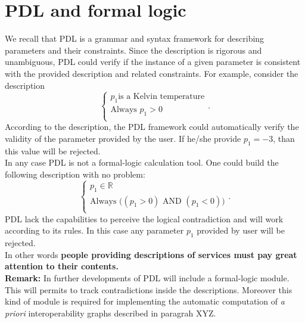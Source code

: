 \documentclass[a4paper,11pt] {article}
\begin{document}
\section{PDL and formal logic}
We recall that PDL is a grammar and syntax framework for describing parameters and their constraints. Since the description is rigorous and unambiguous, PDL could verify if the instance of a given parameter is consistent with the provided description and related constraints. For example, consider the description
\begin{equation}
\left\{
\begin{array}{l}
p_1 \mbox{is a Kelvin temperature}\\
\mbox{Always }  p_1 > 0 \\
\end{array}
\right..
\end{equation}
According to the description, the PDL framework could automatically verify the validity of the parameter provided by the user. 
If he/she provide $p_1=-3$, than this value will be rejected.\\
In any case PDL is not a formal-logic calculation tool. One could build the following description with no problem:
\begin{equation}
\left\{
\begin{array}{l}
p_1 \in \mathbb R\\
\displaystyle \mbox{Always } \big(  (p_1 > 0) \mbox{ AND } (p_1 < 0) \big)\\
\end{array}
\right..
\end{equation}
PDL lack the capabilities to perceive the logical contradiction and will work according to its rules. In   
this case any parameter $p_1$ provided by user will be rejected.\\
In other words {\bf people providing descriptions of services must pay great attention to their contents.}\\

{\bf Remark:} In further developments of PDL will include a formal-logic module. This will permits to track contradictions inside the descriptions. Moreover this kind of module is required for implementing the automatic computation of
{\it a priori} interoperability graphs described in paragrah XYZ.
\end{document}
